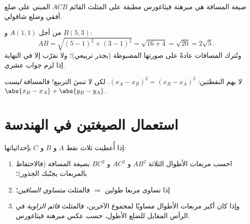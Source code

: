 \begin{omfigure}

{\small صيغة المسافة هي مبرهنة فيثاغورس مطبقة على
المثلث القائم $ACB$ المبني على ضلع أفقي وضلع شاقولي.}
\end{omfigure}

\begin{example}\label{ex:g10:coordgeom:distance}
من أجل $A(1, 1)$ و $B(5, 3)$:
\[
AB = \sqrt{(5-1)^2 + (3-1)^2} = \sqrt{16 + 4} = \sqrt{20} = 2\sqrt 5 .
\]
وتُترك المسافات عادةً على صورتها المضبوطة (بجذر تربيعي)؛ ولا نقرّب إلا
في النهاية إذا لزم جواب عشري.
\end{example}

\begin{remark}
لا يهم  النقطتين: $(x_A - x_B)^2 =
(x_B - x_A)^2$. لكن لا تنسَ التربيع! فالمسافة
\emph{ليست} $\abs{x_B - x_A} + \abs{y_B - y_A}$.
\end{remark}

\section{استعمال الصيغتين في الهندسة}

\begin{method}\label{met:g10:coordgeom:triangle}
إذا أُعطيت ثلاث نقط $A$ و $B$ و $C$ بإحداثياتها:
\begin{enumerate}
  \item احسب مربعات الأطوال الثلاثة $AB^2$ و $AC^2$ و $BC^2$ بصيغة
        المسافة (فالاحتفاظ بالمربعات يجنّبك الجذور)؛
  \item إذا تساوى مربعا طولين $\Rightarrow$ فالمثلث
        \emph{متساوي الساقين}؛
  \item وإذا كان أكبر مربعات الأطوال مساويًا لمجموع الآخرين، فالمثلث
        \emph{قائم الزاوية} في الرأس المقابل للضلع
        الأطول، حسب عكس مبرهنة فيثاغورس.
\end{enumerate}
\end{method}

